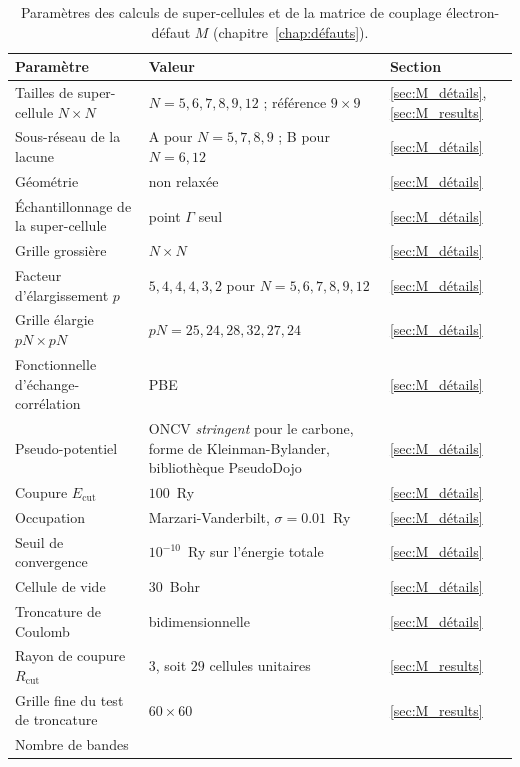 \begin{table}[htbp]
    \centering
    \caption[Paramètres des super-cellules et de la matrice $M$.]{Paramètres des calculs de super-cellules et de la matrice de couplage électron-défaut $M$ (chapitre~\ref{chap:défauts}).}
    \label{tab:param_M}
    \small
    \setlength{\tabcolsep}{4pt}
    \begin{tabular}{p{} p{} p{}}
        \hline\hline
        Paramètre & Valeur & Section \\
        \hline
        Tailles de super-cellule $N\times N$ & $N = 5, 6, 7, 8, 9, 12$ ; référence $9\times 9$ & \ref{sec:M_détails}, \ref{sec:M_results} \\
        Sous-réseau de la lacune & A pour $N = 5, 7, 8, 9$ ; B pour $N = 6, 12$ & \ref{sec:M_détails} \\
        Géométrie & non relaxée & \ref{sec:M_détails} \\
        Échantillonnage de la super-cellule & point $\Gamma$ seul & \ref{sec:M_détails} \\
        Grille grossière & $N\times N$ & \ref{sec:M_détails} \\
        Facteur d'élargissement $p$ & $5, 4, 4, 4, 3, 2$ pour $N = 5, 6, 7, 8, 9, 12$ & \ref{sec:M_détails} \\
        Grille élargie $pN\times pN$ & $pN = 25, 24, 28, 32, 27, 24$ & \ref{sec:M_détails} \\
        Fonctionnelle d'échange-corrélation & PBE & \ref{sec:M_détails} \\
        Pseudo-potentiel & ONCV \textit{stringent} pour le carbone, forme de Kleinman-Bylander, bibliothèque PseudoDojo & \ref{sec:M_détails} \\
        Coupure $E_\text{cut}$ & $100$~Ry & \ref{sec:M_détails} \\
        Occupation & Marzari-Vanderbilt, $\sigma = 0.01$~Ry & \ref{sec:M_détails} \\
        Seuil de convergence & $10^{-10}$~Ry sur l'énergie totale & \ref{sec:M_détails} \\
        Cellule de vide & $30$~Bohr & \ref{sec:M_détails} \\
        Troncature de Coulomb & bidimensionnelle & \ref{sec:M_détails} \\
        Rayon de coupure $R_\text{cut}$ & $3$, soit $29$ cellules unitaires & \ref{sec:M_results} \\
        Grille fine du test de troncature & $60\times 60$ & \ref{sec:M_results} \\
        Nombre de bandes & & \\
        \hline\hline
    \end{tabular}
\end{table}

